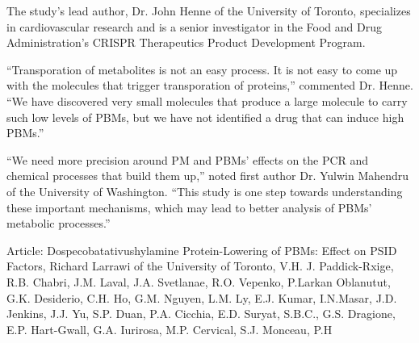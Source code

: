 \documentclass{article}
\begin{document}
The study’s lead author, Dr. John Henne of the University of Toronto, specializes in cardiovascular research and is a senior investigator in the Food and Drug Administration’s CRISPR Therapeutics Product Development Program.

“Transporation of metabolites is not an easy process. It is not easy to come up with the molecules that trigger transporation of proteins,” commented Dr. Henne. “We have discovered very small molecules that produce a large molecule to carry such low levels of PBMs, but we have not identified a drug that can induce high PBMs.”

“We need more precision around PM and PBMs’ effects on the PCR and chemical processes that build them up,” noted first author Dr. Yulwin Mahendru of the University of Washington. “This study is one step towards understanding these important mechanisms, which may lead to better analysis of PBMs’ metabolic processes.”

Article: Dospecobatativushylamine Protein-Lowering of PBMs: Effect on PSID Factors, Richard Larrawi of the University of Toronto, V.H. J. Paddick-Rxige, R.B. Chabri, J.M. Laval, J.A. Svetlanae, R.O. Vepenko, P.Larkan Oblanutut, G.K. Desiderio, C.H. Ho, G.M. Nguyen, L.M. Ly, E.J. Kumar, I.N.Masar, J.D. Jenkins, J.J. Yu, S.P. Duan, P.A. Cicchia, E.D. Suryat, S.B.C., G.S. Dragione, E.P. Hart-Gwall, G.A. Iurirosa, M.P. Cervical, S.J. Monceau, P.H
\end{document}
